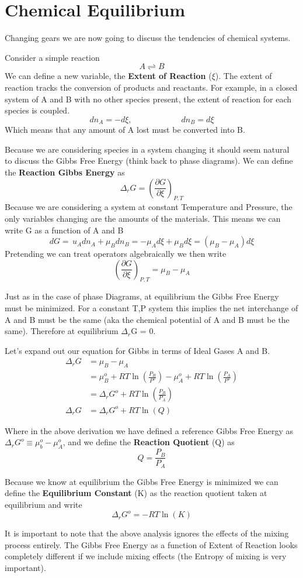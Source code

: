 \documentclass{article}
\newcommand{\be}{\begin{equation}}
\newcommand{\ee}{\end{equation}}
\newcommand{\pd}{\partial}
\begin{document}
\section*{Chemical Equilibrium}
Changing gears we are now going to discuss the tendencies of chemical systems. 

Consider a simple reaction
\be
A \rightleftharpoons B
\ee
We can define a new variable, the \textbf{Extent of Reaction} ($\xi$).
The extent of reaction tracks the conversion of products  and reactants. 
For example, in a closed system of A and B with no other species present, the extent of reaction for each species is coupled. 
\be
dn_A = -d\xi, \qquad \qquad \qquad dn_B = d\xi
\ee
Which means that any amount of A lost must be converted into B. 

Because we are considering species in a system changing it should seem natural to discuss the Gibbs Free Energy (think back to phase diagrams). 
We can define the \textbf{Reaction Gibbs Energy} as 
\be
\Delta_rG = \left(\frac{\pd G}{\pd \xi}\right)_{P,T}
\ee
Because we are considering a system at constant Temperature and Pressure, the only variables changing are the amounts of the materials.
This means we can write G as a function of A and B
\be
dG = \,u_Adn_A + \mu_Bdn_B = -\mu_Ad\xi + \mu_Bd\xi = (\mu_B-\mu_A) d\xi
\ee
Pretending we can treat operators algebraically we then write
\be
\left(\frac{\pd G}{\pd \xi}\right)_{P,T} = \mu_B-\mu_A
\ee

Just as in the case of phase Diagrams, at equilibrium the Gibbs Free Energy must be minimized.
For a constant T,P system this  implies the net interchange of A and B must be the same (aka the chemical potential of A and B must be the same). 
Therefore at equilibrium $\Delta_r$G = 0.

Let's expand out our equation for Gibbs in terms  of Ideal Gases A and B.
\be
\begin{split}
\Delta_rG &= \mu_B - \mu_A \\
&= \mu_B^o + RT\ln\left(\frac{P_B}{P^o}\right) - \mu_A^o + RT\ln\left(\frac{P_A}{P^o}\right) \\
&= \Delta_rG^o + RT\ln\left(\frac{P_B}{P_A}\right)\\
\Delta_rG &= \Delta_rG^o + RT \ln(Q)
\end{split}
\ee

Where in the above derivation we  have defined a reference Gibbs Free Energy as $\Delta_rG^o \equiv \mu_b^o - \mu_A^o$, and we define the \textbf{Reaction Quotient} (Q) as
\be
Q = \frac{P_B}{P_A}
\ee

Because we know at equilibrium the Gibbs Free Energy is minimized we can define the \textbf{Equilibrium Constant} (K) as the reaction quotient taken at equilibrium and write
\be
\Delta_rG^o = -RT\ln(K)
\ee

It is important to note that the above analysis ignores  the effects  of the mixing process entirely.
The Gibbs Free Energy as a function of Extent of Reaction looks completely different if we include mixing effects (the Entropy of mixing is very important). 
\end{document}
